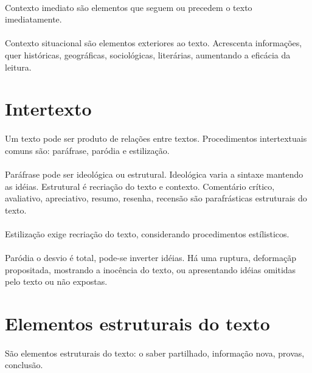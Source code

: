 \paragraph{}
Contexto imediato são elementos que seguem ou precedem o texto imediatamente.

\paragraph{}
Contexto situacional são elementos exteriores ao texto. Acrescenta informações, quer históricas, geográficas, sociológicas, literárias, aumentando a eficácia da leitura.

\section{Intertexto}

\paragraph{}
Um texto pode ser produto de relações entre textos. Procedimentos intertextuais comuns são: paráfrase, paródia e estilização.

\paragraph{}
Paráfrase pode ser ideológica ou estrutural. Ideológica varia a sintaxe mantendo as idéias. Estrutural é recriação do texto e contexto. Comentário crítico, avaliativo, apreciativo, resumo, resenha, recensão são parafrásticas estruturais do texto.

\paragraph{}
Estilização exige recriação do texto, considerando procedimentos estílisticos.

\paragraph{}
Paródia o desvio é total, pode-se inverter idéias. Há uma ruptura, deformaçãp propositada, mostrando a inocência do texto, ou apresentando idéias omitidas pelo texto ou não expostas.

\section{Elementos estruturais do texto}
\paragraph{}
São elementos estruturais do texto: o saber partilhado, informação nova, provas, conclusão.


